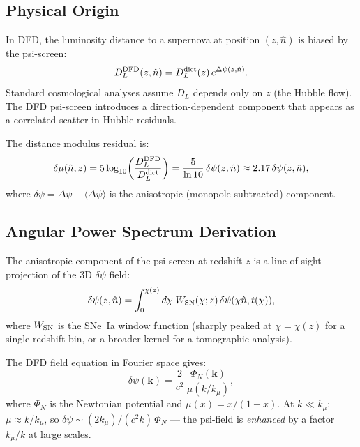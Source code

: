 \documentclass[11pt,a4paper]{article}
\newcounter{findingctr}
\newenvironment{finding}[1][]{%
  \refstepcounter{findingctr}%
  \begin{tcolorbox}[colback=blue!3!white, colframe=blue!50!black,
    title=\textbf{Finding \thefindingctr: #1}]
}{%
  \end{tcolorbox}%
}
\newcommand{\Dpsi}{\Delta\psi}
\begin{document}
\begin{finding}[\textbf{DECISIVE}: SNe~Ia $\psi$-Screen Anisotropy ---
  Precise Angular Power Spectrum]
\label{find:sne-precise}

\subsection*{Physical Origin}

In DFD, the luminosity distance to a supernova at position $(z, \hat{n})$
is biased by the psi-screen:
\begin{equation}
D_L^{\rm DFD}(z, \hat{n}) = D_L^{\rm dict}(z)\,
e^{\Dpsi(z, \hat{n})}.
\label{eq:DL-bias}
\end{equation}
Standard cosmological analyses assume $D_L$ depends only on $z$ (the
Hubble flow).  The DFD psi-screen introduces a direction-dependent
component that appears as a correlated scatter in Hubble residuals.

The distance modulus residual is:
\begin{equation}
\delta\mu(\hat{n}, z) = 5\log_{10}\!\left(\frac{D_L^{\rm DFD}}{D_L^{\rm dict}}\right)
= \frac{5}{\ln 10}\,\delta\psi(z, \hat{n})
\approx 2.17\,\delta\psi(z, \hat{n}),
\end{equation}
where $\delta\psi = \Dpsi - \langle\Dpsi\rangle$ is the
anisotropic (monopole-subtracted) component.

\subsection*{Angular Power Spectrum Derivation}

The anisotropic component of the psi-screen at redshift $z$ is
a line-of-sight projection of the 3D $\delta\psi$ field:
\begin{equation}
\delta\psi(z, \hat{n}) = \int_0^{\chi(z)} d\chi\;
W_{\rm SN}(\chi; z)\,\delta\psi(\chi\hat{n}, t(\chi)),
\end{equation}
where $W_{\rm SN}$ is the SNe~Ia window function (sharply peaked
at $\chi = \chi(z)$ for a single-redshift bin, or a broader kernel
for a tomographic analysis).

The DFD field equation in Fourier space gives:
\begin{equation}
\delta\psi(\mathbf{k}) = \frac{2}{c^2}\,
\frac{\Phi_N(\mathbf{k})}{\mu(k/k_\mu)},
\end{equation}
where $\Phi_N$ is the Newtonian potential and $\mu(x) = x/(1+x)$.
At $k \ll k_\mu$: $\mu \approx k/k_\mu$, so $\delta\psi \sim
(2k_\mu)/(c^2 k)\,\Phi_N$ --- the psi-field is \emph{enhanced}
by a factor $k_\mu/k$ at large scales.


\end{finding}
\end{document}
